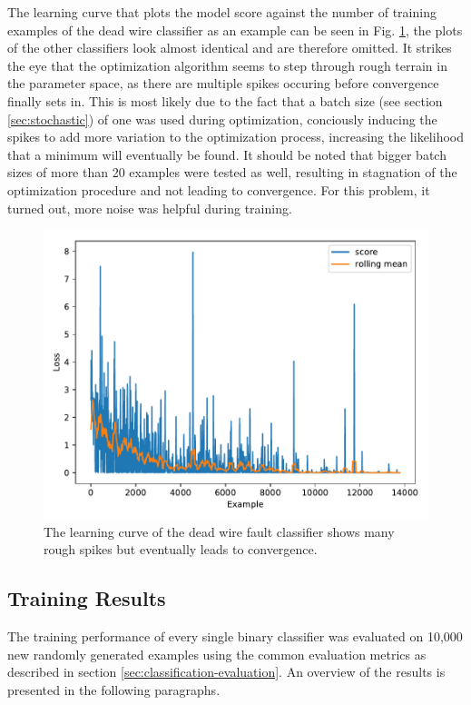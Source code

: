The learning curve that plots the model score against the
number of training examples of the dead wire classifier as an example
can be seen in Fig. \ref{fig:learning-curve}, the plots of the other
classifiers look almost identical and are therefore omitted. It
strikes the eye that the optimization algorithm seems to step through
rough terrain in the parameter space, as there are multiple spikes
occuring before convergence finally sets in. This is most likely due
to the fact that a batch size (see section \ref{sec:stochastic}) of
one was used during optimization, conciously inducing the spikes to
add more variation to the optimization process, increasing
the likelihood that a minimum will eventually be found. It should be
noted that bigger batch sizes of more than 20 examples were tested as
well, resulting in stagnation of the optimization procedure and not
leading to convergence. For this problem, it turned out, more noise
was helpful during training.

\begin{figure}[h]
  \centering
  \includegraphics[width=.8\textwidth]{../figures/score_test}
  \caption{The learning curve of the dead wire fault classifier
    shows many rough spikes but eventually leads to convergence.}
  \label{fig:learning-curve}
\end{figure}

\subsection{Training Results}

The training performance of every single binary classifier was
evaluated on 10,000 new randomly generated
examples using the common evaluation metrics as described in section
\ref{sec:classification-evaluation}. An overview of the results is
presented in the following paragraphs.

